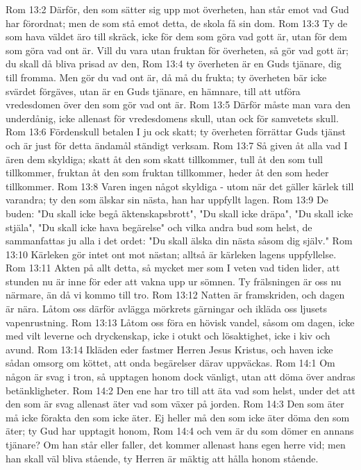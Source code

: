 Rom 13:2  Därför, den som sätter sig upp mot överheten, han står emot vad Gud har förordnat; men de som stå emot detta, de skola få sin dom.
Rom 13:3  Ty de som hava väldet äro till skräck, icke för dem som göra vad gott är, utan för dem som göra vad ont är. Vill du vara utan fruktan för överheten, så gör vad gott är; du skall då bliva prisad av den,
Rom 13:4  ty överheten är en Guds tjänare, dig till fromma. Men gör du vad ont är, då må du frukta; ty överheten bär icke svärdet förgäves, utan är en Guds tjänare, en hämnare, till att utföra vredesdomen över den som gör vad ont är.
Rom 13:5  Därför måste man vara den underdånig, icke allenast för vredesdomens skull, utan ock för samvetets skull.
Rom 13:6  Fördenskull betalen I ju ock skatt; ty överheten förrättar Guds tjänst och är just för detta ändamål ständigt verksam.
Rom 13:7  Så given åt alla vad I ären dem skyldiga; skatt åt den som skatt tillkommer, tull åt den som tull tillkommer, fruktan åt den som fruktan tillkommer, heder åt den som heder tillkommer.
Rom 13:8  Varen ingen något skyldiga - utom när det gäller kärlek till varandra; ty den som älskar sin nästa, han har uppfyllt lagen.
Rom 13:9  De buden: "Du skall icke begå äktenskapsbrott", "Du skall icke dräpa", "Du skall icke stjäla", "Du skall icke hava begärelse" och vilka andra bud som helst, de sammanfattas ju alla i det ordet: "Du skall älska din nästa såsom dig själv."
Rom 13:10  Kärleken gör intet ont mot nästan; alltså är kärleken lagens uppfyllelse.
Rom 13:11  Akten på allt detta, så mycket mer som I veten vad tiden lider, att stunden nu är inne för eder att vakna upp ur sömnen. Ty frälsningen är oss nu närmare, än då vi kommo till tro.
Rom 13:12  Natten är framskriden, och dagen är nära. Låtom oss därför avlägga mörkrets gärningar och ikläda oss ljusets vapenrustning.
Rom 13:13  Låtom oss föra en hövisk vandel, såsom om dagen, icke med vilt leverne och dryckenskap, icke i otukt och lösaktighet, icke i kiv och avund.
Rom 13:14  Ikläden eder fastmer Herren Jesus Kristus, och haven icke sådan omsorg om köttet, att onda begärelser därav uppväckas.
Rom 14:1  Om någon är svag i tron, så upptagen honom dock vänligt, utan att döma över andras betänkligheter.
Rom 14:2  Den ene har tro till att äta vad som helst, under det att den som är svag allenast äter vad som växer på jorden.
Rom 14:3  Den som äter må icke förakta den som icke äter. Ej heller må den som icke äter döma den som äter; ty Gud har upptagit honom,
Rom 14:4  och vem är du som dömer en annans tjänare? Om han står eller faller, det kommer allenast hans egen herre vid; men han skall väl bliva stående, ty Herren är mäktig att hålla honom stående.
